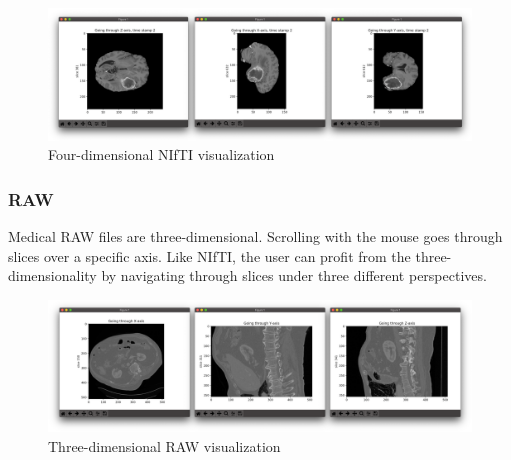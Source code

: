 \begin{figure}[!h]
\centering
\includegraphics[width=\textwidth, keepaspectratio=true]{./figures/visualize_brain_nii.png}
\caption{Four-dimensional NIfTI visualization}
\label{fig:visualize_brain_nii}
\end{figure}



\subsubsection{RAW}

Medical RAW files are three-dimensional. Scrolling with the mouse goes through slices over a specific axis. Like NIfTI, the user can profit from the three-dimensionality by navigating through slices under three different perspectives.

\begin{figure}[!h]
\centering
\includegraphics[width=\textwidth, keepaspectratio=true]{./figures/visualize_liver_raw.png}
\caption{Three-dimensional RAW visualization}
\label{fig:visualize_liver_raw}
\end{figure}

